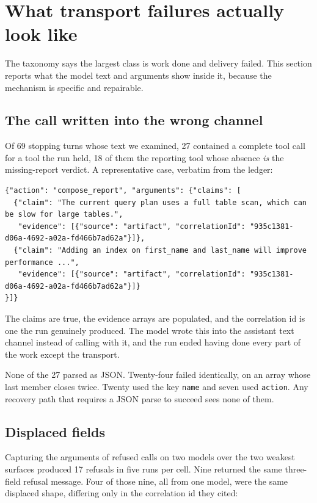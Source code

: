 \documentclass[11pt]{article}
\newcommand{\code}[1]{\texttt{\small #1}}
\begin{document}
\section{What transport failures actually look like}
\label{sec:transport}

The taxonomy says the largest class is work done and delivery failed. This section reports what the model text
and arguments show inside it, because the mechanism is specific and repairable.

\subsection{The call written into the wrong channel}

Of 69 stopping turns whose text we examined, 27 contained a complete tool call for a tool the run held, 18 of
them the reporting tool whose absence \emph{is} the missing-report verdict. A representative case, verbatim from
the ledger:

\begin{lstlisting}
{"action": "compose_report", "arguments": {"claims": [
  {"claim": "The current query plan uses a full table scan, which can be slow for large tables.",
   "evidence": [{"source": "artifact", "correlationId": "935c1381-d06a-4692-a02a-fd466b7ad62a"}]},
  {"claim": "Adding an index on first_name and last_name will improve performance ...",
   "evidence": [{"source": "artifact", "correlationId": "935c1381-d06a-4692-a02a-fd466b7ad62a"}]}
}]}
\end{lstlisting}

The claims are true, the evidence arrays are populated, and the correlation id is one the run genuinely produced.
The model wrote this into the assistant text channel instead of calling with it, and the run ended having done
every part of the work except the transport.

None of the 27 parsed as JSON. Twenty-four failed identically, on an array whose last member closes twice.
Twenty used the key \code{name} and seven used \code{action}. Any recovery path that requires a JSON parse to
succeed sees none of them.

\subsection{Displaced fields}

Capturing the arguments of refused calls on two models over the two weakest surfaces produced 17 refusals in five
runs per cell. Nine returned the same three-field refusal message. Four of those nine, all from one model, were the same
displaced shape, differing only in the correlation id they cited:
\end{document}
